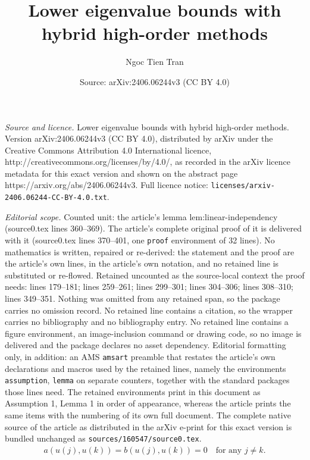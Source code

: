 \documentclass[10pt,a4paper]{amsart}
\title{Lower eigenvalue bounds with hybrid high-order methods}
\author{Ngoc Tien Tran}
\date{Source: arXiv:2406.06244v3 (CC BY 4.0)}
\begin{document}
\maketitle

\noindent\emph{Source and licence.} Lower eigenvalue bounds with hybrid high-order methods. Version arXiv:2406.06244v3 (CC BY 4.0), distributed by arXiv under the Creative Commons Attribution 4.0 International licence, http://creativecommons.org/licenses/by/4.0/, as recorded in the arXiv licence metadata for this exact version and shown on the abstract page https://arxiv.org/abs/2406.06244v3. Full licence notice: \texttt{licenses/arxiv-2406.06244-CC-BY-4.0.txt}.\par\smallskip

\noindent\textit{Editorial scope.} Counted unit: the article's lemma lem:linear-independency (source0.tex lines 360--369). The article's complete original proof of it is delivered with it (source0.tex lines 370--401, one \texttt{proof} environment of 32 lines). No mathematics is written, repaired or re-derived: the statement and the proof are the article's own lines, in the article's own notation, and no retained line is substituted or re-flowed.  Retained uncounted as the source-local context the proof needs: lines 179--181; lines 259--261; lines 299--301; lines 304--306; lines 308--310; lines 349--351.  Nothing was omitted from any retained span, so the package carries no omission record.  No retained line contains a citation, so the wrapper carries no bibliography and no bibliography entry.  No retained line contains a figure environment, an image-inclusion command or drawing code, so no image is delivered and the package declares no asset dependency.  Editorial formatting only, in addition: an AMS \texttt{amsart} preamble that restates the article's own declarations and macros used by the retained lines, namely the environments \texttt{assumption}, \texttt{lemma} on separate counters, together with the standard packages those lines need.  The retained environments print in this document as Assumption 1, Lemma 1 in order of appearance, whereas the article prints the same items with the numbering of its own full document.  The complete native source of the article as distributed in the arXiv e-print for this exact version is bundled unchanged as \texttt{sources/160547/source0.tex}.
\begin{align}\label{def:a-orthogonality}
	a(u(j), u(k)) = b(u(j), u(k)) = 0 \quad\text{for any } j \neq k.
\end{align}
\end{document}
